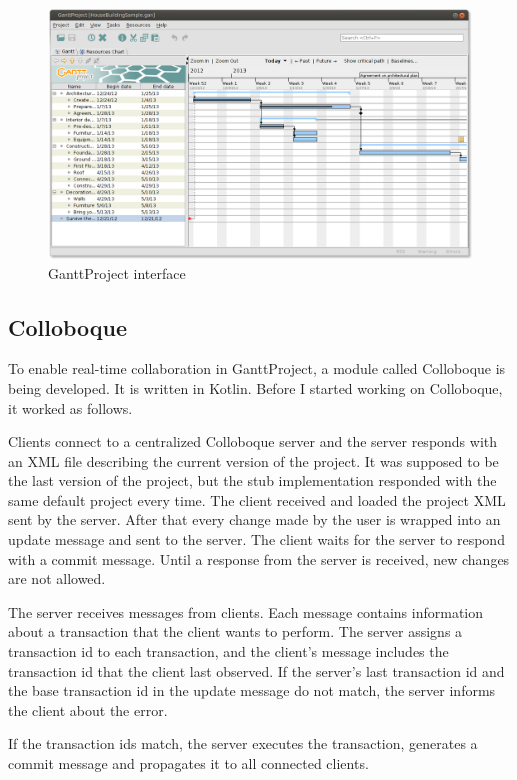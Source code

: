 \documentclass[a4paper, 11pt, oneside]{article}
\theoremstyle{definition}
\begin{document}
\begin{figure}
    \includegraphics[width=\linewidth]{img/ganttproject.png}
    \caption{GanttProject interface}
    \label{fig:ganttscreen}
\end{figure}

\subsection{Colloboque}
To enable real-time collaboration in GanttProject, a module called Colloboque is being developed. It is written in Kotlin. Before I started working on Colloboque, it worked as follows.

Clients connect to a centralized Colloboque server and the server responds with an XML file describing the current version of the project. It was supposed to be the last version of the project, but the stub implementation responded with the same default project every time. The client received and loaded the project XML sent by the server. After that every change made by the user is wrapped into an update message and sent to the server. The client waits for the server to respond with a commit message. Until a response from the server is received, new changes are not allowed. 

The server receives messages from clients. Each message contains information about a transaction that the client wants to perform. The server assigns a transaction id to each transaction, and the client's message includes the transaction id that the client last observed. If the server's last transaction id and the base transaction id in the update message do not match, the server informs the client about the error.

If the transaction ids match, the server executes the transaction, generates a commit message and propagates it to all connected clients.
\end{document}

